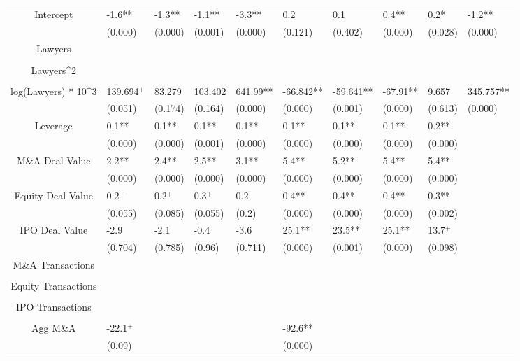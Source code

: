 \documentclass{article}
\begin{document}
\begin{table}[H]
\begin{tabular}{|clllllllll|}
Intercept & -1.6** & -1.3** & -1.1** & -3.3** & 0.2 & 0.1 & 0.4** & 0.2* & -1.2** \\ 
   & (0.000) & (0.000) & (0.001) & (0.000) & (0.121) & (0.402) & (0.000) & (0.028) & (0.000) \\ 
  Lawyers &  &  &  &  &  &  &  &  &  \\ 
   &  &  &  &  &  &  &  &  &  \\ 
  Lawyers^2 &  &  &  &  &  &  &  &  &  \\ 
   &  &  &  &  &  &  &  &  &  \\ 
  log(Lawyers) * 10^3 & 139.694$^{+}$ & 83.279 & 103.402 & 641.99** & -66.842** & -59.641** & -67.91** & 9.657 & 345.757** \\ 
   & (0.051) & (0.174) & (0.164) & (0.000) & (0.000) & (0.001) & (0.000) & (0.613) & (0.000) \\ 
  Leverage & 0.1** & 0.1** & 0.1** & 0.1** & 0.1** & 0.1** & 0.1** & 0.2** &  \\ 
   & (0.000) & (0.000) & (0.001) & (0.000) & (0.000) & (0.000) & (0.000) & (0.000) &  \\ 
  M\&A Deal Value & 2.2** & 2.4** & 2.5** & 3.1** & 5.4** & 5.2** & 5.4** & 5.4** &  \\ 
   & (0.000) & (0.000) & (0.000) & (0.000) & (0.000) & (0.000) & (0.000) & (0.000) &  \\ 
  Equity Deal Value & 0.2$^{+}$ & 0.2$^{+}$ & 0.3$^{+}$ & 0.2 & 0.4** & 0.4** & 0.4** & 0.3** &  \\ 
   & (0.055) & (0.085) & (0.055) & (0.2) & (0.000) & (0.000) & (0.000) & (0.002) &  \\ 
  IPO Deal Value & -2.9 & -2.1 & -0.4 & -3.6 & 25.1** & 23.5** & 25.1** & 13.7$^{+}$ &  \\ 
   & (0.704) & (0.785) & (0.96) & (0.711) & (0.000) & (0.001) & (0.000) & (0.098) &  \\ 
  M\&A Transactions &  &  &  &  &  &  &  &  &  \\ 
   &  &  &  &  &  &  &  &  &  \\ 
  Equity Transactions &  &  &  &  &  &  &  &  &  \\ 
   &  &  &  &  &  &  &  &  &  \\ 
  IPO Transactions &  &  &  &  &  &  &  &  &  \\ 
   &  &  &  &  &  &  &  &  &  \\ 
  Agg M\&A & -22.1$^{+}$ &  &  &  & -92.6** &  &  &  &  \\ 
   & (0.09) &  &  &  & (0.000) &  &  &  &  \\ 

\end{tabular}
\end{table}
\end{document}
